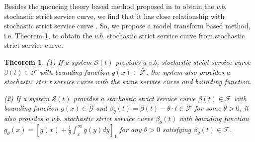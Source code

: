 \documentclass[12pt]{article}
\newtheorem{theorem}{Theorem}
\begin{document}
Besides the queueing theory based method proposed in \cite{Wu2010Model} to obtain the $v.b.$ stochastic strict service curve, we find that it has close relationship with stochastic strict service curve \cite{JiangLiu-15877}. So, we propose a model transform based method, i.e. Theorem \ref{mtrans}, to obtain the $v.b.$ stochastic strict service curve from stochastic strict service curve.
\begin{theorem}\label{mtrans}
(1) If a system $\mathcal{S}(t)$ provides a $v.b.$ stochastic strict service curve $\beta(t)\in\mathcal{F}$ with bounding function $g(x)\in\bar{\mathcal{F}}$, the system also provides a stochastic strict service curve with the same service curve and bounding function.

(2) If a system $\mathcal{S}(t)$ provides a stochastic strict service curve $\beta(t)\in\mathcal{F}$ with bounding function $g(x)\in\bar{\mathcal{G}}$ and $\beta_{\theta}(t)=\beta(t)-\theta\cdot t\in\mathcal{F}$ for some $\theta>0$, it also provides a $v.b.$ stochastic strict service curve $\beta_{\theta}(t)$ with bounding function $g_{\theta}(x)=[g(x)+\frac{1}{\theta}\int_x^\infty g(y)dy]_1$ for any $\theta>0$ satisfying $\beta_{\theta}(t)\in\mathcal{F}$.
\end{theorem}
\end{document}
